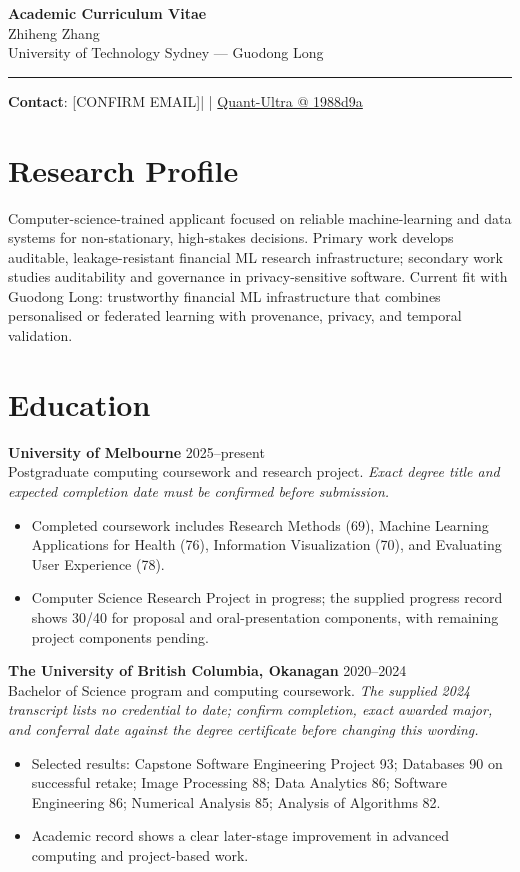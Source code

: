 \documentclass[11pt]{article}
\makeatletter
\newcommand{\ApplicantName}{Zhiheng Zhang}
\newcommand{\ApplicantEmail}{[CONFIRM EMAIL]}
\newcommand{\ApplicantPhone}{[CONFIRM PHONE]}
\newcommand{\ApplicantGitHub}{\href{https://github.com/zhiheng-zhang-Mera/Quant-Ultra/tree/1988d9a8530da91a8158de864d098ea869098923}{Quant-Ultra @ 1988d9a}}
\makeatother
\begin{document}
\begin{center}
{\LARGE\bfseries Academic Curriculum Vitae}\\[0.25em]
{\large \ApplicantName}\\
University of Technology Sydney --- Guodong Long
\end{center}
\vspace{0.35em}\hrule\vspace{0.65em}

\textbf{Contact}: \ApplicantEmail\quad | \quad \ApplicantPhone\quad | \quad \ApplicantGitHub

\section*{Research Profile}
Computer-science-trained applicant focused on reliable machine-learning and data systems for non-stationary, high-stakes decisions. Primary work develops auditable, leakage-resistant financial ML research infrastructure; secondary work studies auditability and governance in privacy-sensitive software. Current fit with Guodong Long: trustworthy financial ML infrastructure that combines personalised or federated learning with provenance, privacy, and temporal validation.

\section*{Education}
\textbf{University of Melbourne} \hfill 2025--present\\
Postgraduate computing coursework and research project. \textit{Exact degree title and expected completion date must be confirmed before submission.}
\begin{itemize}
\item Completed coursework includes Research Methods (69), Machine Learning Applications for Health (76), Information Visualization (70), and Evaluating User Experience (78).
\item Computer Science Research Project in progress; the supplied progress record shows 30/40 for proposal and oral-presentation components, with remaining project components pending.
\end{itemize}

\textbf{The University of British Columbia, Okanagan} \hfill 2020--2024\\
Bachelor of Science program and computing coursework. \textit{The supplied 2024 transcript lists no credential to date; confirm completion, exact awarded major, and conferral date against the degree certificate before changing this wording.}
\begin{itemize}
\item Selected results: Capstone Software Engineering Project 93; Databases 90 on successful retake; Image Processing 88; Data Analytics 86; Software Engineering 86; Numerical Analysis 85; Analysis of Algorithms 82.
\item Academic record shows a clear later-stage improvement in advanced computing and project-based work.
\end{itemize}
\end{document}
